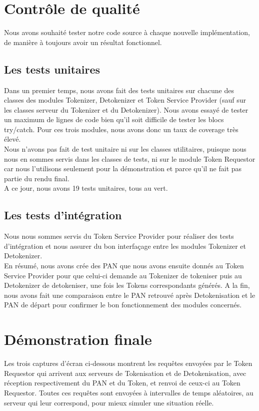 \documentclass{report}
\begin{document}
\section{Contrôle de qualité}
Nous avons souhaité tester notre code source à chaque nouvelle implémentation, de manière à toujours avoir un résultat fonctionnel.  

\subsection{Les tests unitaires}
Dans un premier temps, nous avons fait des tests unitaires sur chacune des classes des modules Tokenizer, Detokenizer et Token Service Provider (sauf sur les classes serveur du Tokenizer et du Detokenizer). Nous avons essayé de tester un maximum de lignes de code bien qu'il soit difficile de tester les blocs try/catch. Pour ces trois modules, nous avons donc un taux de coverage très élevé.\\
Nous n'avons pas fait de test unitaire ni sur les classes utilitaires, puisque nous nous en sommes servis dans les classes de tests, ni sur le module Token Requestor car nous l'utilisons seulement pour la démonstration et parce qu'il ne fait pas partie du rendu final.\\
A ce jour, nous avons 19 tests unitaires, tous au vert.

\subsection{Les tests d'intégration}
Nous nous sommes servis du Token Service Provider pour réaliser des tests d'intégration et nous assurer du bon interfaçage entre les modules Tokenizer et Detokenizer.\\
En résumé, nous avons crée des PAN que nous avons ensuite donnés au Token Service Provider pour que celui-ci demande au Tokenizer de tokeniser puis au Detokenizer de detokeniser, une fois les Tokens correspondants générés. A la fin, nous avons fait une comparaison entre le PAN retrouvé après Detokenisation et le PAN de départ pour confirmer le bon fonctionnement des modules concernés. 

\section{Démonstration finale}
Les trois captures d'écran ci-dessous montrent les requêtes envoyées par le Token Requestor qui arrivent aux serveurs de Tokenisation et de Detokenisation, avec réception respectivement du PAN et du Token, et renvoi de ceux-ci au Token Requestor. Toutes ces requêtes sont envoyées à intervalles de temps aléatoires, au serveur qui leur correspond, pour mieux simuler une situation réelle. 
\end{document}
